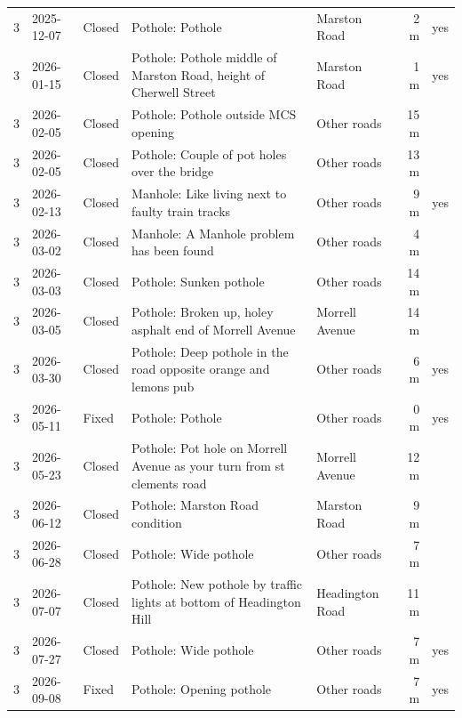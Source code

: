 \begin{longtable}{@{}lll>{\raggedright\arraybackslash}p{46mm}lrl@{}}
3 & 2025-12-07 & Closed & Pothole: Pothole & Marston Road & 2 m & yes \\
3 & 2026-01-15 & Closed & Pothole: Pothole middle of Marston Road, height of Cherwell Street & Marston Road & 1 m & yes \\
3 & 2026-02-05 & Closed & Pothole: Pothole outside MCS opening & Other roads & 15 m &  \\
3 & 2026-02-05 & Closed & Pothole: Couple of pot holes over the bridge & Other roads & 13 m &  \\
3 & 2026-02-13 & Closed & Manhole: Like living next to faulty train tracks & Other roads & 9 m & yes \\
3 & 2026-03-02 & Closed & Manhole: A Manhole problem has been found & Other roads & 4 m &  \\
3 & 2026-03-03 & Closed & Pothole: Sunken pothole & Other roads & 14 m &  \\
3 & 2026-03-05 & Closed & Pothole: Broken up, holey asphalt end of Morrell Avenue & Morrell Avenue & 14 m &  \\
3 & 2026-03-30 & Closed & Pothole: Deep pothole in the road opposite orange and lemons pub & Other roads & 6 m & yes \\
3 & 2026-05-11 & Fixed & Pothole: Pothole & Other roads & 0 m & yes \\
3 & 2026-05-23 & Closed & Pothole: Pot hole on Morrell Avenue as your turn from st clements road & Morrell Avenue & 12 m &  \\
3 & 2026-06-12 & Closed & Pothole: Marston Road condition & Marston Road & 9 m &  \\
3 & 2026-06-28 & Closed & Pothole: Wide pothole & Other roads & 7 m &  \\
3 & 2026-07-07 & Closed & Pothole: New pothole by traffic lights at bottom of Headington Hill & Headington Road & 11 m &  \\
3 & 2026-07-27 & Closed & Pothole: Wide pothole & Other roads & 7 m & yes \\
3 & 2026-09-08 & Fixed & Pothole: Opening pothole & Other roads & 7 m & yes \\
\end{longtable}
\endgroup
